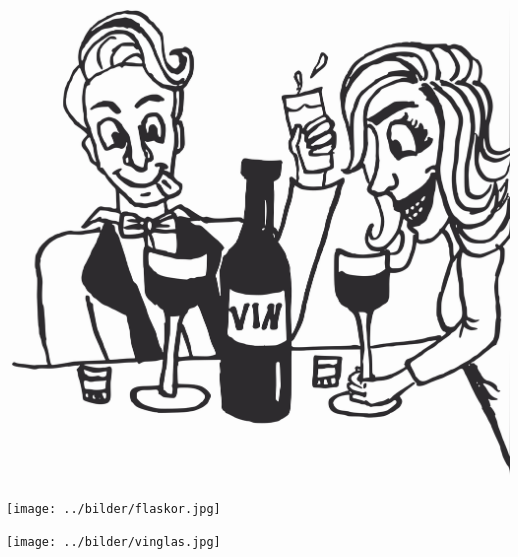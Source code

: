 %

\begin{intersong}
\sffamily\bfseries\LARGE{}
\begin{center}
	\vspace{10mm}
\includegraphics[width=1\textwidth]{../bilder/fardigabilder/BilderTillKapitel/vinvisor.png} 
\end{center}
\end{intersong}
\sclearpage

\sclearpage

\sclearpage

\begin{intersong}
\begin{center}
\texttt{[image: ../bilder/flaskor.jpg]} 
\end{center}
\end{intersong}
\sclearpage


\begin{intersong}
\begin{center}
\texttt{[image: ../bilder/vinglas.jpg]} 
\end{center}
\end{intersong}
\sclearpage


\sclearpage

\sclearpage

